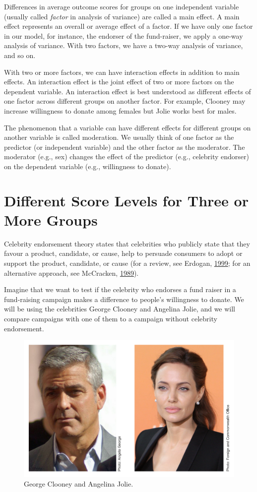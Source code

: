 \documentclass[a4paper]{book}
\theoremstyle{definition}
\theoremstyle{definition}
\theoremstyle{definition}
\theoremstyle{remark}
\begin{document}
Differences in average outcome scores for groups on one independent
variable (usually called \emph{factor} in analysis of variance) are
called a main effect. A main effect represents an overall or average
effect of a factor. If we have only one factor in our model, for
instance, the endorser of the fund-raiser, we apply a one-way analysis
of variance. With two factors, we have a two-way analysis of variance,
and so on.

With two or more factors, we can have interaction effects in addition to
main effects. An interaction effect is the joint effect of two or more
factors on the dependent variable. An interaction effect is best
understood as different effects of one factor across different groups on
another factor. For example, Clooney may increase willingness to donate
among females but Jolie works best for males.

The phenomenon that a variable can have different effects for different
groups on another variable is called moderation. We usually think of one
factor as the predictor (or independent variable) and the other factor
as the moderator. The moderator (e.g., sex) changes the effect of the
predictor (e.g., celebrity endorser) on the dependent variable (e.g.,
willingness to donate).

\section{Different Score Levels for Three or More
Groups}\label{different-score-levels-for-three-or-more-groups}

Celebrity endorsement theory states that celebrities who publicly state
that they favour a product, candidate, or cause, help to persuade
consumers to adopt or support the product, candidate, or cause (for a
review, see Erdogan, \protect\hyperlink{ref-RefWorks:3940}{1999}; for an
alternative approach, see McCracken,
\protect\hyperlink{ref-RefWorks:3941}{1989}).

Imagine that we want to test if the celebrity who endorses a fund raiser
in a fund-raising campaign makes a difference to people's willingness to
donate. We will be using the celebrities George Clooney and Angelina
Jolie, and we will compare campaigns with one of them to a campaign
without celebrity endorsement.

\begin{figure}
\includegraphics[width=0.5\linewidth]{figures/ClooneyJolie} \caption{George Clooney and Angelina Jolie.}\label{fig:clooneyjolie}
\end{figure}
\end{document}
